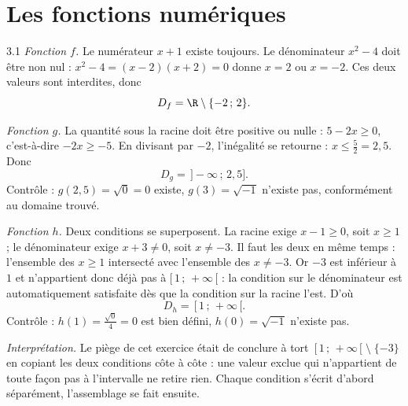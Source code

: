 \clearpage
\chapter{Les fonctions numériques}

\begin{corrige}{3.1}
\emph{Fonction $f$.} Le numérateur $x + 1$ existe toujours. Le dénominateur $x^{2} - 4$ doit être non nul : $x^{2} - 4 = (x-2)(x+2) = 0$ donne $x = 2$ ou $x = -2$. Ces deux valeurs sont interdites, donc
\[
D_f = \R \setminus \{-2\,;\,2\}.
\]

\emph{Fonction $g$.} La quantité sous la racine doit être positive ou nulle : $5 - 2x \geq 0$, c'est-à-dire $-2x \geq -5$. En divisant par $-2$, l'inégalité se retourne : $x \leq \frac{5}{2} = 2{,}5$. Donc
\[
D_g = \,]-\infty\,;\,2{,}5].
\]
Contrôle : $g(2{,}5) = \sqrt{0} = 0$ existe, $g(3) = \sqrt{-1}$ n'existe pas, conformément au domaine trouvé.

\emph{Fonction $h$.} Deux conditions se superposent. La racine exige $x - 1 \geq 0$, soit $x \geq 1$ ; le dénominateur exige $x + 3 \neq 0$, soit $x \neq -3$. Il faut les deux en même temps : l'ensemble des $x \geq 1$ intersecté avec l'ensemble des $x \neq -3$. Or $-3$ est inférieur à $1$ et n'appartient donc déjà pas à $[\,1\,;\,+\infty\,[$ : la condition sur le dénominateur est automatiquement satisfaite dès que la condition sur la racine l'est. D'où
\[
D_h = \,[\,1\,;\,+\infty\,[.
\]
Contrôle : $h(1) = \frac{\sqrt{0}}{4} = 0$ est bien défini, $h(0) = \sqrt{-1}$ n'existe pas.

\emph{Interprétation.} Le piège de cet exercice était de conclure à tort $\,[\,1\,;\,+\infty\,[\;\setminus\;\{-3\}$ en copiant les deux conditions côte à côte : une valeur exclue qui n'appartient de toute façon pas à l'intervalle ne retire rien. Chaque condition s'écrit d'abord séparément, l'assemblage se fait ensuite.
\end{corrige}

